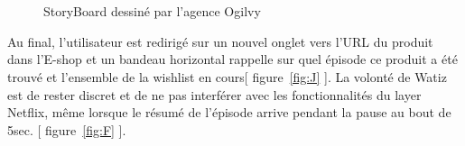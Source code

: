 \documentclass[a4paper, 12pt]{report}
\begin{document}
\begin{figure}[htp]
   ~
  ~\\ %
   ~
 
  \caption{StoryBoard dessiné par l'agence Ogilvy}
  \label{fig:gallerie1}
\end{figure}
Au final, l’utilisateur est redirigé sur un nouvel onglet vers l’URL du produit dans l'E-shop et un bandeau horizontal rappelle sur quel épisode ce produit a été trouvé et l’ensemble de la wishlist en cours[ figure~\ref{fig:J} ].
La volonté de Watiz est de rester discret et de ne pas interférer avec les fonctionnalités du layer Netflix, même lorsque le résumé de l’épisode arrive pendant la pause au bout de 5sec. [ figure~\ref{fig:F} ].
\end{document}
